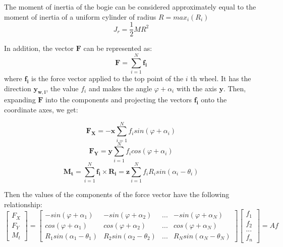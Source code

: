 \documentclass[oneside,final,14pt]{extreport}
\newcommand{\bs}{\boldsymbol}
\begin{document}
\begin{figure} [H]
\end{figure}
The moment of inertia of the bogie can be considered approximately equal to the moment of inertia of a uniform cylinder of radius $ R = max_{i} (R_{i}) $
\begin{equation}
J_{r}
=
\frac{1}{2}
MR ^{2}
\end{equation}


In addition, the vector $ \bs{F} $ can be represented as:
\begin{equation}
\bs{F}
=
\sum_{i = 1} ^{N} \bs{f_{i}}
\end{equation}
where $ \bs{f_{i}} $ is the force vector applied to the top point of the $ i $ th wheel. It has the direction $ \bs{y_{w, i}} $, the value $ f_{i} $ and makes the angle $ \varphi + \alpha_{i} $ with the axis $ \bs{y} $.
Then, expanding $ \bs{F} $ into the components and projecting the vectors $ \bs{f_{i}} $ onto the coordinate axes, we get:

\begin{equation}
\bs{F_{X}}
=
-
\bs{x}
\sum_{i = 1} ^{N} f_{i} sin (\varphi + \alpha_{i})
\end{equation}
\begin{equation}
\bs{F_{Y}}
=
\bs{y}
\sum_{i = 1} ^{N} f_{i} cos (\varphi + \alpha_{i})
\end{equation}
\begin{equation}
\label{eq: rot_force}
\bs{M_{t}}
=
\sum_{i = 1} ^{N} \bs{f_{i}} \times \bs{R_{i}}
=
\bs{z}
\sum_{i = 1} ^{N} f_{i} R_{i} sin (\alpha_{i} - \theta_{i})
\end{equation}



Then the values ​​of the components of the force vector have the following relationship:
\begin{equation}
\begin{bmatrix}
F_{X} \\
F_{Y} \\
M_{t}
\end{bmatrix}
=
\begin{bmatrix}
-sin (\varphi + \alpha_{1}) &
-sin (\varphi + \alpha_{2}) &
... &
-sin (\varphi + \alpha_{N}) \\
cos (\varphi + \alpha_{1}) &
cos (\varphi + \alpha_{2}) &
... &
cos (\varphi + \alpha_{N}) \\
R_{1} sin (\alpha_{1} - \theta_{1}) &
R_{2} sin (\alpha_{2} - \theta_{2}) &
 ... &
R_{N} sin (\alpha_{N} - \theta_{N})
\end{bmatrix}
\begin{bmatrix}
f_{1} \\
f_{2} \\
... \\
f_{n}
\end{bmatrix}
=
Af
\end{equation}
\end{document}
